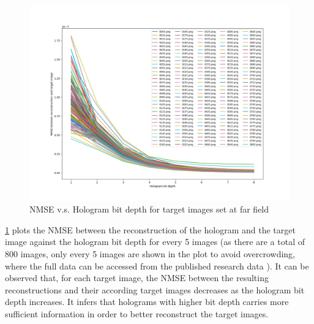 	\begin{figure} [H]
	   \begin{center}
	   \includegraphics[trim={80 50 90 70}, clip, width = \textwidth]{GS_Fraunhofer_NMSE_VS_Hologram bit depth.png}
	   \end{center}
	   \caption{\label{fig:GS_Fraunhofer_NMSE_VS_Hologram_bit_depth} NMSE v.s. Hologram bit depth for target images set at far field}
	\end{figure}

	\cref{fig:GS_Fraunhofer_NMSE_VS_Hologram_bit_depth} plots the NMSE between the reconstruction of the hologram and the target image against the hologram bit depth for every 5 images (as there are a total of 800 images, only every 5 images are shown in the plot to avoid overcrowding, where the full data can be accessed from the published research data \cite{research_data_Sha2024}). It can be observed that, for each target image, the NMSE between the resulting reconstructions and their according target images decreases as the hologram bit depth increases. It infers that holograms with higher bit depth carries more sufficient information in order to better reconstruct the target images.

